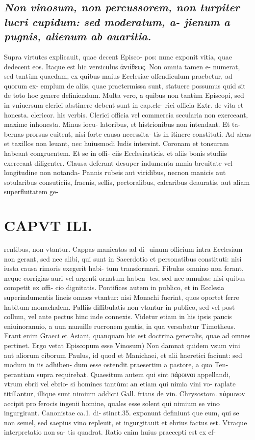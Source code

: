 \documentclass{article}
\begin{document}
\begin{pages}
\subsection*{\textit{ Non vinosum, non percussorem, non turpiter lucri cupidum: sed moderatum, a- jienum a pugnis, alienum ab auaritia. }}\pstart Supra virtutes explicauit, quae decent Episco- pos: nunc exponit vitia, quae dedecent eos. Itaque est hic versiculus ἀντίθεως. Non omnia tamen e- numerat, sed tantùm quaedam, ex quibus maius Ecclesiae offendiculum praebetur, ad quorum ex- emplum de aliis, quae praetermissa sunt, statuere possumus quid sit de toto hoc genere definiendum. Multa vero, a quibus non tantùm Episcopi, sed in vniuersum clerici abstinere debent sunt in cap.cle- rici officia Extr. de vita et honesta. clericor. his verbis. Clerici officia vel commercia secularia non exerceant, maxime inhonesta. Minus iocu- latoribus, et histrionibus non intendant. Et ta- bernas prorsus euitent, nisi forte causa necessita- tis in itinere constituti. Ad aleas et taxillos non leuant, nec huiusmodi ludis intersint. Coronam et tonsuram habeant congruentem. Et se in offi- ciis Ecclesiasticis, et aliis bonis studiis exerceant diligenter. Clausa deferant desuper indumenta mmia breuitate vel longitudine non notanda- Pannis rubeis aut viridibus, necnon manicis aut sotularibus consuticiis, fraenis, sellis, pectoralibus, calcaribus deauratis, aut aliam superfluitatem ge-  \pend
\section*{CAPVT  ILI. }
\marginpar{[ p.131 ]}\pstart rentibus, non vtantur. Cappas manicatas ad di- uinum officium intra Ecclesiam non gerant, sed nec alibi, qui sunt in Sacerdotio et personatibus constituti: nisi iusta causa rimoris exegerit habi- tum transformari. Fibulas omnino non ferant, neque corrigias auri vel argenti ornatum haben- tes, sed nec annulos: nisi quibus competit ex offi- cio dignitatis. Pontifices autem in publico, et in Ecclesia superindumentis lineis omnes vtantur: nisi Monachi fuerint, quos oportet ferre habitum monachalem. Palliis diffibulatis non vtantur in publico, sed vel post collum, vel ante pectus hinc inde connexis. Videtur etiam in his ipsis paucis eniuinoranuio, a uun nanuille rucronem gentis, in qua versabatur Timotheus. Erant enim Graeci et Asiani, quanquam hic est doctrina generalis, quae ad omnes pertinet. Ergo vetat Episcopum esse  \pend\pstart Vinosum) Non damnat quidem vsum vini aut aliorum ciborum Paulus, id quod et Manichaei, et alii haeretici faciunt: sed modum in iis adhiben- dum esse ostendit praesertim a pastore, a quo Ten- perantiam supra requirebat. Quaesitum autem qui sint πάροινοι appellandi, vtrum ebrii vel ebrio- si homines tantùm: an etiam qui nimia vini vo- raplate titillantur, illique sunt nimium addicti Gall. frians de vin. Chrysostom. πάροινον accipit pro ferocis ingenii homine, quales esse solent qui nimium se vino ingurgirant. Canonistae ca.1. di- stinct.35. exponunt definiunt que eum, qui se non semel, sed saepius vino repleuit, et ingurgitauit et ebrius factus est. Vtraque interpretatio non sa- tis quadrat. Ratio enim huius praecepti est ex ef-  \pend

\end{pages}
\end{document}
